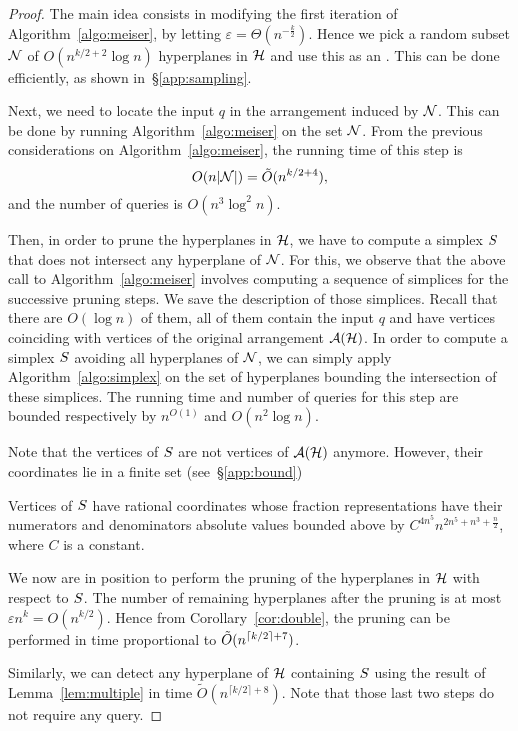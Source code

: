 \begin{proof}
The main idea consists in modifying the first iteration of Algorithm~\ref{algo:meiser}, by
letting $\varepsilon = \Theta(n^{-\frac{k}{2}})$.
Hence we pick a random subset $\mathcal{N}$ of
$O(n^{k/2 + 2} \log n)$ hyperplanes in $\mathcal{H}$ and use this as an \enet.
This can be done efficiently, as shown in~\S\ref{app:sampling}.

Next, we need to locate the input $q$ in the arrangement induced by
$\mathcal{N}$. This can be done by running Algorithm~\ref{algo:meiser} on the set
$\mathcal{N}$. From the previous considerations on Algorithm~\ref{algo:meiser}, the
running time of this step is
$$
O(n|\mathcal{N}|) = \tilde{O}(n^{k/2 + 4}),
$$
and the number of queries is $O(n^3\log^2 n)$.

Then, in order to prune the hyperplanes in $\mathcal{H}$, we have to
compute a simplex $S$ that does not intersect any hyperplane of
$\mathcal{N}$. For this, we observe that the above call to Algorithm~\ref{algo:meiser}
involves computing a sequence of simplices for the successive pruning
steps.
%
We save the description of those simplices. Recall that there are
$O(\log n)$ of them, all of them contain the input $q$ and have vertices
coinciding with vertices of the original arrangement $\mathcal{A}(\mathcal{H})$. In
order to compute a simplex $S$ avoiding all hyperplanes of
$\mathcal{N}$, we can simply apply Algorithm~\ref{algo:simplex} on the set of
hyperplanes bounding the intersection of these simplices. The running time
and number of queries for this step are bounded respectively by
$n^{O(1)}$ and $O(n^2\log n)$.

Note that the vertices of $S$ are not vertices
of $\mathcal{A}(\mathcal{H})$ anymore. However, their coordinates lie in a finite set
(see~\S\ref{app:bound})
\begin{lemma}\label{lem:bound}
Vertices of $S$ have rational coordinates whose fraction representations
have their numerators and denominators absolute values bounded above by
$C^{4n^5} n^{2n^5+n^3+\frac n2}$, where $C$ is a constant.
\end{lemma}

We now are in position to perform the pruning of the hyperplanes in $\mathcal{H}$ with
respect to $S$. The number of remaining hyperplanes after the pruning is
at most $\varepsilon n^k = O(n^{k/2})$. Hence from Corollary~\ref{cor:double}, the
pruning can be performed in time proportional to $\tilde{O}(n^{\lceil k/2\rceil + 7})$.

Similarly, we can detect any hyperplane of $\mathcal{H}$ containing $S$ using the
result of Lemma~\ref{lem:multiple} in time $\tilde{O}(n^{\lceil k/2\rceil +
8})$. Note that those last two steps do not require any query.


\end{proof}
